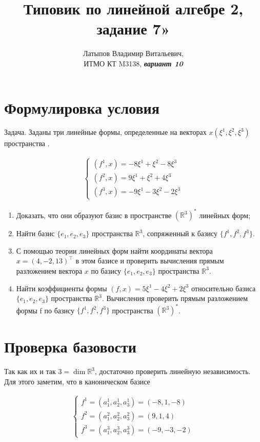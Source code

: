 \documentclass[12pt, a4paper]{article}
\author{Латыпов Владимир Витальевич, \\ ИТМО КТ M3138, \Huge{\textit{\textbf{вариант 10}}}}
\title{Типовик по линейной алгебре 2, задание 7»}
\begin{document}
    \tit

\section{Формулировка условия}

\begin{statement}
    Задача. Заданы три линейные формы, определенные на векторах $x(\xi^1, \xi^2, \xi^3)$ пространства .

    \begin{gather}
        \begin{cases}
            (f^1, x) = -8 \xi^1 + \xi^2 - 8 \xi^3 \\
            (f^2, x) = 9 \xi^1 + \xi^2 + 4 \xi^3 \\
            (f^3, x) = -9 \xi^1 -3 \xi^2 - 2 \xi^3
        \end{cases}
    \end{gather}

    \begin{enumerate}
        \item Доказать, что они образуют базис в пространстве $\left(\mathbb{R}^3\right)^*$ линейных форм;
        \item Найти базис $\{e_1, e_2, e_3\}$ пространства $\mathbb{R}^3$, сопряженный к базису $\{ f^1, f^2, f^3 \}$.
        \item С помощью теории линейных форм найти координаты вектора $x = (4, -2, 13)^\top$ в этом базисе и проверить вычисления прямым
        разложением вектора $x$ по базису $\{e_1, e_2, e_3\}$ пространства $\mathbb{R}^3$.
        \item Найти коэффициенты формы $(f, x) = 5\xi^1 -4 \xi^2 + 2 \xi^3$ относительно базиса $\{e_1, e_2, e_3\}$ пространства $\mathbb{R}^3$. 
        Вычисления проверить прямым разложением формы f по базису $\{ f^1, f^2, f^3 \}$ пространства $\left(\mathbb{R}^3\right)^*$.
    \end{enumerate}
\end{statement}


\section{Проверка базовости}

Так как их и так $3 = \dim \mathbb{R}^3$, достаточно проверить линейную независимость.
Для этого заметим, что в каноническом базисе

\begin{gather}
    \begin{cases}
        f^1 = (a^1_1, a^1_2, a^1_3) = (-8, 1, -8) \\
        f^2 = (a^2_1, a^2_2, a^2_3) = (9, 1, 4) \\
        f^3 = (a^3_1, a^3_2, a^3_3) = (-9, -3, -2)
    \end{cases}
\end{gather}
\end{document}
